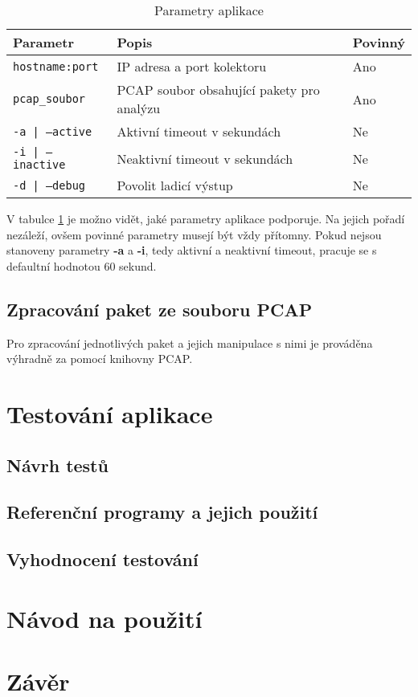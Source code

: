 \documentclass[11pt, a4paper, hidelinks]{article}[08.10.2023]
\begin{document}
    \begin{table}[ht]
        \centering
        \begin{tabular}{|l|l|l|}
        \hline
        \textbf{Parametr}         & \textbf{Popis}                                                  & \textbf{Povinný}  \\ \hline
        \texttt{hostname:port}    & IP adresa a port kolektoru                                      & Ano              \\ \hline
        \texttt{pcap\_soubor}     & PCAP soubor obsahující pakety pro analýzu                       & Ano              \\ \hline
        \texttt{-a | --active}         & Aktivní timeout v sekundách                                     & Ne               \\ \hline
        \texttt{-i | --inactive}         & Neaktivní timeout v sekundách                                   & Ne               \\ \hline
        \texttt{-d | --debug}               & Povolit ladicí výstup                                           & Ne               \\ \hline
        \end{tabular}
        \caption{Parametry aplikace}
        \label{parametry}
    \end{table}
        
    V tabulce \ref{parametry} je možno vidět, jaké parametry aplikace podporuje. Na jejich pořadí nezáleží, ovšem povinné parametry
    musejí být vždy přítomny. Pokud nejsou stanoveny parametry \textbf{-a} a \textbf{-i}, tedy aktivní a neaktivní timeout, pracuje se s 
    defaultní hodnotou 60 sekund.

    \subsection{Zpracování paket ze souboru PCAP}
    Pro zpracování jednotlivých paket a jejich manipulace s nimi je prováděna výhradně za pomocí knihovny PCAP\cite{Pcap_general}.
    \section{Testování aplikace}
    \subsection{Návrh testů}
    \subsection{Referenční programy a jejich použití}
    \subsection{Vyhodnocení testování}

    \section{Návod na použití}

    \section{Závěr}

    \pagebreak

    
    
\end{document}
